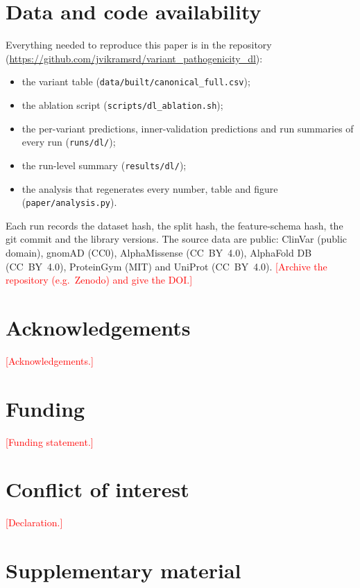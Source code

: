 \documentclass[11pt]{article}
\newcommand{\todo}[1]{\textcolor{red}{[#1]}}
\begin{document}
\section*{Data and code availability}
Everything needed to reproduce this paper is in the repository
(\url{https://github.com/jvikramsrd/variant_pathogenicity_dl}):
\begin{itemize}
\item the variant table (\texttt{data/built/canonical\_full.csv});
\item the ablation script (\texttt{scripts/dl\_ablation.sh});
\item the per-variant predictions, inner-validation predictions and run summaries of every
  run (\texttt{runs/dl/});
\item the run-level summary (\texttt{results/dl/});
\item the analysis that regenerates every number, table and figure
  (\texttt{paper/analysis.py}).
\end{itemize}
Each run records the dataset hash, the split hash, the feature-schema hash, the git
commit and the library versions. The source data are public: ClinVar (public domain),
gnomAD (CC0), AlphaMissense (CC~BY~4.0), AlphaFold DB (CC~BY~4.0), ProteinGym (MIT) and
UniProt (CC~BY~4.0). \todo{Archive the repository (e.g.\ Zenodo) and give the DOI.}

\section*{Acknowledgements}
\todo{Acknowledgements.}

\section*{Funding}
\todo{Funding statement.}

\section*{Conflict of interest}
\todo{Declaration.}




\clearpage
\appendix
\renewcommand{\thetable}{S\arabic{table}}
\renewcommand{\thefigure}{S\arabic{figure}}
\setcounter{table}{0}
\setcounter{figure}{0}
\section*{Supplementary material}
\end{document}
